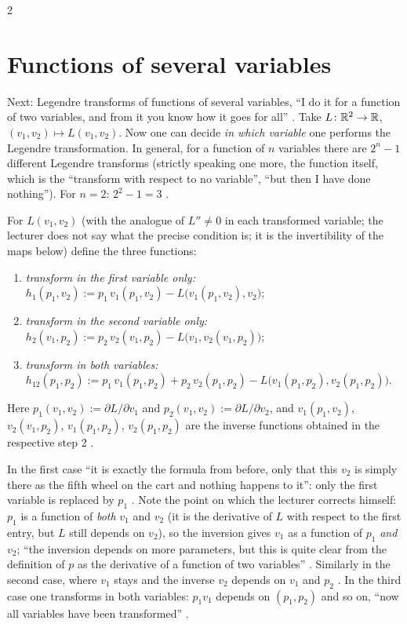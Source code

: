 \begin{paracol}{2}
\section{Functions of several variables}\label{sec:lt-several}

Next: Legendre transforms of functions of several variables, ``I do it for a function of two variables, and from it you know how it goes for all'' . Take $L\colon\mathbb{R}^2\to\mathbb{R}$, $(v_1,v_2)\mapsto L(v_1,v_2)$. Now one can decide \emph{in which variable} one performs the Legendre transformation. In general, for a function of $n$ variables there are $2^n-1$ different Legendre transforms (strictly speaking one more, the function itself, which is the ``transform with respect to no variable'', ``but then I have done nothing''). For $n=2$: $2^2-1=3$ .

\begin{definition}\label{def:lt-partial}
For $L(v_1,v_2)$ (with the analogue of $L''\neq0$ in each transformed variable; the lecturer does not say what the precise condition is; it is the invertibility of the maps below) define the three functions:
\begin{enumerate}
  \item \emph{transform in the first variable only:} $h_1(p_1,v_2):=p_1\,v_1(p_1,v_2)-L\bigl(v_1(p_1,v_2),v_2\bigr)$;
  \item \emph{transform in the second variable only:} $h_2(v_1,p_2):=p_2\,v_2(v_1,p_2)-L\bigl(v_1,v_2(v_1,p_2)\bigr)$;
  \item \emph{transform in both variables:} $h_{12}(p_1,p_2):=p_1\,v_1(p_1,p_2)+p_2\,v_2(p_1,p_2)-L\bigl(v_1(p_1,p_2),v_2(p_1,p_2)\bigr)$.
\end{enumerate}
Here $p_1(v_1,v_2):=\partial L/\partial v_1$ and $p_2(v_1,v_2):=\partial L/\partial v_2$, and $v_1(p_1,v_2)$, $v_2(v_1,p_2)$, $v_1(p_1,p_2)$, $v_2(p_1,p_2)$ are the inverse functions obtained in the respective step 2 .
\end{definition}
In the first case ``it is exactly the formula from before, only that this $v_2$ is simply there as the fifth wheel on the cart and nothing happens to it'': only the first variable is replaced by $p_1$ . Note the point on which the lecturer corrects himself: $p_1$ is a function of \emph{both} $v_1$ and $v_2$ (it is the derivative of $L$ with respect to the first entry, but $L$ still depends on $v_2$), so the inversion gives $v_1$ as a function of $p_1$ \emph{and} $v_2$; ``the inversion depends on more parameters, but this is quite clear from the definition of $p$ as the derivative of a function of two variables'' . Similarly in the second case, where $v_1$ stays and the inverse $v_2$ depends on $v_1$ and $p_2$ . In the third case one transforms in both variables: $p_1v_1$ depends on $(p_1,p_2)$ and so on, ``now all variables have been transformed'' .


\end{paracol}
